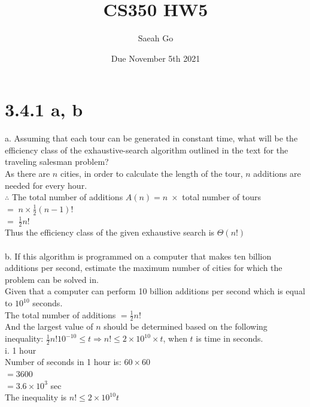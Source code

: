 \documentclass{article}
\title{CS350 HW5}
\author{Saeah Go}
\date{Due November 5th 2021}
\begin{document}
\maketitle

\section{3.4.1 a, b}
a. Assuming that each tour can be generated in constant time, what will be the efficiency class of the exhaustive-search algorithm outlined in the text for the traveling salesman problem? \\
\indent As there are $n$ cities, in order to calculate the length of the tour, $n$ additions are needed for every hour. \\
\indent \indent $\therefore$ The total number of additions $A(n) = n \; \times$ total number of tours
\indent \indent \indent \indent \indent \indent \indent \indent \indent\indent \indent \indent \indent \indent $= \; n \times \frac{1}{2}(n-1)!$ \\
\indent \indent \indent \indent \indent \indent \indent \indent \indent\indent \indent \indent \indent \indent $= \; \frac{1}{2}n!$ \\
\indent Thus the efficiency class of the given exhaustive search is $\Theta(n!)$ \\ \\
b. If this algorithm is programmed on a computer that makes ten billion additions per second, estimate the maximum number of cities for which the problem can be solved in. \\
\indent Given that a computer can perform 10 billion additions per second which is equal to $10^{10}$ seconds. \\
The total number of additions $ = \frac{1}{2}n!$ \\
And the largest value of $n$ should be determined based on the following inequality: $\frac{1}{2}n!10^{-10} \le t \Longrightarrow n! \le 2 \times 10^{10} \times t$, when $t$ is time in seconds. \\
i. 1 hour \\
\indent Number of seconds in 1 hour is: $60 \times 60$ \\ 
\indent \indent \indent \indent \indent \indent \indent \indent \indent \indent $= 3600$ \\
\indent \indent \indent \indent \indent \indent \indent \indent \indent \indent $= 3.6 \times 10^3$ sec \\
\indent The inequality is $n! \le 2 \times 10^{10}t$ \\
\end{document}
